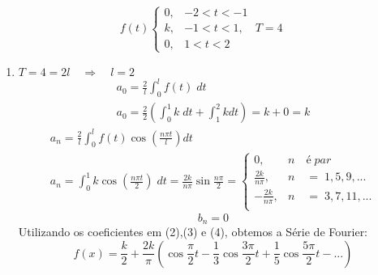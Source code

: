 \documentclass[12pt]{article}
\begin{document}
\section{}
\begin{equation}
f(t)
\begin{cases}
	0 , & -2 < t < -1 \\
    k , & -1 < t < 1, \quad T=4\\
    0 , &  1 < t < 2
\end{cases}
\end{equation}
\begin{enumerate}[label= S.]
	\item
    $T=4 = 2l \quad\Rightarrow\quad l = 2$
    \begin{equation}
    \begin{split}
    a_{0} = \frac{2}{l} \int_{0}^{l} f(t)\; dt \\
    a_{0} = \frac{2}{2} \left(\int_{0}^{1} k\; dt + \int_{1}^{2} k dt\right)= k + 0 = k 
    \end{split}
    \end{equation}
    \begin{equation} \begin{split}
    a_{n} = \frac{2}{l}\int_{0}^{l} f(t) \cos\left(\frac{n\pi t}{l}\right) dt\\
    a_{n} = \int_{0}^{1} k \cos \left(\frac{n\pi t}{2}\right) \; dt = \frac{2k}{n\pi} \sin \frac{n\pi}{2} =
    \begin{cases}
    0 , & n \quad é\;  par\\
    \frac{2k}{n\pi} , & n \quad =\;  1,5,9,...\\
    -\frac{2k}{n\pi} , & n \quad =\;  3,7,11,...\\
    \end{cases}
    \end{split}\end{equation}
    \begin{equation}
    b_{n} = 0
    \end{equation}
    Utilizando os coeficientes em (2),(3) e (4), obtemos a Série de Fourier:
    \begin{equation}
    f(x) = \frac{k}{2} + \frac{2k}{\pi} \left( \cos \frac{\pi}{2}t - \frac{1}{3} \cos \frac{3\pi}{2}t + \frac{1}{5} \cos \frac{5\pi}{2}t -...\right)
    \end{equation}
\end{enumerate}
\end{document}
